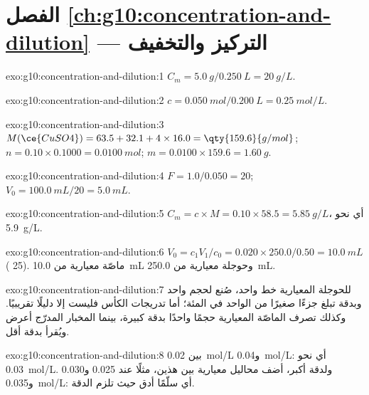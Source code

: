 \section*{الفصل \ref{ch:g10:concentration-and-dilution} --- التركيز والتخفيف}

\begin{solution}{exo:g10:concentration-and-dilution:1}
$C_m = \qty{5.0}{g} / \qty{0.250}{L} = \qty{20}{g/L}$.
\end{solution}

\begin{solution}{exo:g10:concentration-and-dilution:2}
$c = \qty{0.050}{mol} / \qty{0.200}{L} = \qty{0.25}{mol/L}$.
\end{solution}

\begin{solution}{exo:g10:concentration-and-dilution:3}
$M(\ce{CuSO4}) = 63.5 + 32.1 + 4 \times 16.0 = \qty{159.6}{g/mol}$;
$n = 0.10 \times 0.1000 = \qty{0.0100}{mol}$; $m = 0.0100 \times 159.6 =
\qty{1.60}{g}$.
\end{solution}

\begin{solution}{exo:g10:concentration-and-dilution:4}
$F = 1.0 / 0.050 = 20$; $V_0 = \qty{100.0}{mL} / 20 = \qty{5.0}{mL}$.
\end{solution}

\begin{solution}{exo:g10:concentration-and-dilution:5}
$C_m = c \times M = 0.10 \times 58.5 = \qty{5.85}{g/L}$، أي نحو
\qty{5.9}{g/L}.
\end{solution}

\begin{solution}{exo:g10:concentration-and-dilution:6}
$V_0 = c_1 V_1 / c_0 = 0.020 \times 250.0 / 0.50 = \qty{10.0}{mL}$
( 25). ماصّة معيارية من \qty{10.0}{mL} وحوجلة معيارية من
\qty{250.0}{mL}.
\end{solution}

\begin{solution}{exo:g10:concentration-and-dilution:7}
للحوجلة المعيارية خط واحد، صُنع لحجم واحد وبدقة تبلغ جزءًا صغيرًا من الواحد في
المئة؛ أما تدريجات الكأس فليست إلا دليلًا تقريبيًا. وكذلك تصرف الماصّة
المعيارية حجمًا واحدًا بدقة كبيرة، بينما المخبار المدرّج أعرض ويُقرأ بدقة
أقل.
\end{solution}

\begin{solution}{exo:g10:concentration-and-dilution:8}
بين \qty{0.02}{mol/L} و\qty{0.04}{mol/L}: أي نحو \qty{0.03}{mol/L}.
ولدقة أكبر، أضف محاليل معيارية بين هذين، مثلًا عند
0.025 و0.030 و\qty{0.035}{mol/L}: أي سلّمًا أدق حيث تلزم الدقة.
\end{solution}

